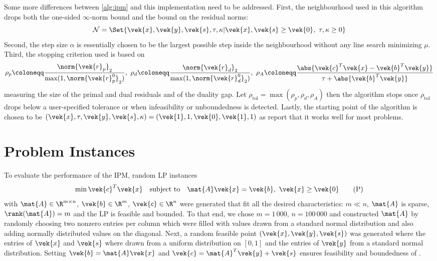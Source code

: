 Some more differences between \cref{alg:ipm} and this implementation need to be addressed.
First, the neighbourhood used in this algorithm drops both the one-sided \(\infty\)-norm bound and the bound on the residual norms:
\begin{equation}
  \mathcal{N} = \Set{ \vek{x}, \vek{y}, \vek{s}, \tau, \kappa | \vek{x}, \vek{s} \geq \vek{0}, \ \tau, \kappa \geq 0 }
\end{equation}
Second, the step size \(\alpha\) is essentially chosen to be the largest possible step inside the neighbourhood without any line search minimizing \(\mu\).
Third, the stopping criterion used is based on 
\begin{equation}
  \rho_p \coloneqq \frac{\norm{\vek{r}_p}_2}{\max(1, \norm{\vek{r}^0_p}_2)}, \ 
  \rho_d \coloneqq \frac{\norm{\vek{r}_d}_2}{\max(1, \norm{\vek{r}^0_d}_2)}, \ 
  \rho_A \coloneqq \frac{\abs{\vek{c}^T\vek{x} - \vek{b}^T \vek{y}}}{\tau + \abs{\vek{b}^T\vek{y}}}
\end{equation}
measuring the size of the primal and dual residuals and of the duality gap.
Let \(\rho_{\mathrm{tol}} = \max(\rho_p, \rho_d, \rho_A)\) then the algorithm stops once \(\rho_{\mathrm{tol}}\) drops below a user-specified tolerance or when infeasibility or unboundedness is detected.
Lastly, the starting point of the algorithm is chosen to be \((\vek{x}, \tau, \vek{y}, \vek{s}, \kappa) = (\vek{1}, 1, \vek{0}, \vek{1}, 1)\) as \textcite{AndersenAndersen-MosekInteriorPointMethod} report that it works well for most problems.

\section{Problem Instances}\label{sec:problem-instance}

To evaluate the performance of the IPM, random LP instances 
\begin{equation}\label{eqn:primal-lp-instance}
  \min \vek{c}^T \vek{x} \quad \text{subject to} \quad \mat{A}\vek{x} = \vek{b}, \ \vek{x} \geq \vek{0} \tag{P}
 \end{equation}
with \(\mat{A} \in \R^{m \times n}\), \(\vek{b} \in \R^m\), \(\vek{c} \in \R^n\) were generated that fit all the desired characteristics: \(m \ll n\), \(\mat{A}\) is sparse, \(\rank(\mat{A}) = m\) and the LP is feasible and bounded.
To that end, we chose \(m = 1\,000\), \(n = 100\,000\) and constructed \(\mat{A}\) by randomly choosing two nonzero entries per column which were filled with values drawn from a standard normal distribution and also adding normally distributed values on the diagonal.
Next, a random feasible point \((\vek{x}, \vek{y}, \vek{s})\) was generated where the entries of \(\vek{x}\) and \(\vek{s}\) where drawn from a uniform distribution on \([0, 1]\) and the entries of \(\vek{y}\) from a standard normal distribution.
Setting \(\vek{b} = \mat{A} \vek{x}\) and \(\vek{c} = \mat{A}^T \vek{y} + \vek{s}\) ensures feasibility and boundedness of \labelcref{eqn:primal-lp-instance}.

